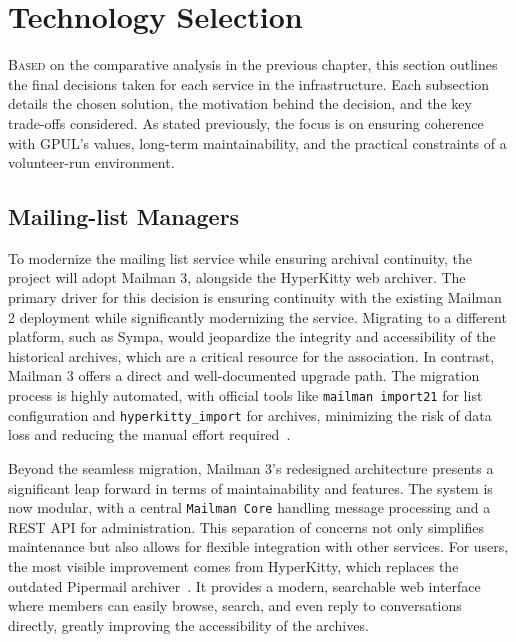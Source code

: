 %

\chapter{Technology Selection}
\label{chap:technology-selection}

\lettrine{B}{ased} on the comparative analysis in the previous chapter, this section outlines the final decisions taken for each service in the infrastructure.  
Each subsection details the chosen solution, the motivation behind the decision, and the key trade-offs considered.  
As stated previously, the focus is on ensuring coherence with GPUL's values, long-term maintainability, and the practical constraints of a volunteer-run environment.

\section{Mailing-list Managers}

To modernize the mailing list service while ensuring archival continuity, the project will adopt Mailman 3, alongside the HyperKitty web archiver. The primary driver for this decision is ensuring continuity with the existing Mailman 2 deployment while significantly modernizing the service. Migrating to a different platform, such as Sympa, would jeopardize the integrity and accessibility of the historical archives, which are a critical resource for the association. In contrast, Mailman 3 offers a direct and well-documented upgrade path. The migration process is highly automated, with official tools like \texttt{mailman import21} for list configuration and \texttt{hyperkitty\_import} for archives, minimizing the risk of data loss and reducing the manual effort required~\cite{mailman-migration-docs}.

Beyond the seamless migration, Mailman 3's redesigned architecture presents a significant leap forward in terms of maintainability and features. The system is now modular, with a central \texttt{Mailman Core} handling message processing and a REST API for administration. This separation of concerns not only simplifies maintenance but also allows for flexible integration with other services. For users, the most visible improvement comes from HyperKitty, which replaces the outdated Pipermail archiver~\cite{hyperkitty-docs}. It provides a modern, searchable web interface where members can easily browse, search, and even reply to conversations directly, greatly improving the accessibility of the archives.

